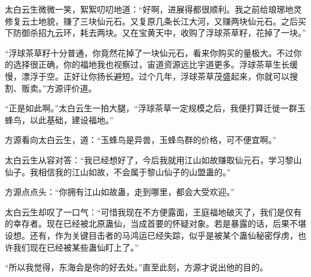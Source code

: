 \begin{this_body}
太白云生微微一笑，絮絮叨叨地道：“好啊，进展得都很顺利。我之前给琅琊地灵修复云土地貌，赚了三块仙元石。又复原几条长江大河，又赚两块仙元石。之后买下防御杀招九云环，耗去两块。又在宝黄天中，收购了浮球茶草籽，花掉了一块。”

“浮球茶草籽十分普通，你竟然花掉了一块仙元石，看来你购买的量极大。不过你的选择很正确，你的福地我也视察过，宙道资源远比宇道更多。浮球茶草生长缓慢，漂浮于空。正好让你扬长避短。过个几年，浮球茶草茂盛起来，你就可以搜割、贩卖。”方源评价道。

“正是如此啊。”太白云生一拍大腿，“浮球茶草一定规模之后，我便打算迁徙一群玉蜂鸟，以此基础，建设福地。”

方源看向太白云生，道：“玉蜂鸟是异兽，玉蜂鸟群的价格，可不便宜啊。”

太白云生从容对答：“我已经想好了，今后我就用江山如故赚取仙元石，学习黎山仙子。我相信我的江山如故，不会属于黎山仙子的山盟蛊的。”

方源点点头：“你拥有江山如故蛊，走到哪里，都会大受欢迎。”

太白云生却叹了一口气：“可惜我现在不方便露面，王庭福地破灭了，我们是仅有的幸存者。现在已经被北原蛊仙，当成首要的怀疑对象。若是暴露的话，后果不堪设想。还有，作为关键目击者的马鸿运已经失踪，似乎是被某个蛊仙秘密俘虏，也许我们现在已经被某些蛊仙盯上了。”

“所以我觉得，东海会是你的好去处。”直至此刻，方源才说出他的目的。

\end{this_body}

